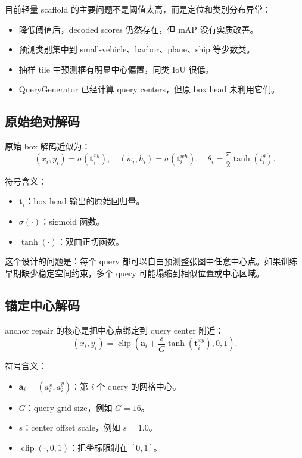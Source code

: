 \documentclass[11pt,a4paper]{ctexart}
\begin{document}
目前轻量 scaffold 的主要问题不是阈值太高，而是定位和类别分布异常：
\begin{itemize}
  \item 降低阈值后，decoded scores 仍然存在，但 mAP 没有实质改善。
  \item 预测类别集中到 small-vehicle、harbor、plane、ship 等少数类。
  \item 抽样 tile 中预测框有明显中心偏置，同类 IoU 很低。
  \item QueryGenerator 已经计算 query centers，但原 box head 未利用它们。
\end{itemize}

\subsection{原始绝对解码}

原始 box 解码近似为：
\[
(x_i,y_i)=\sigma(\bm t_i^{xy}),
\quad
(w_i,h_i)=\sigma(\bm t_i^{wh}),
\quad
\theta_i=\frac{\pi}{2}\tanh(t_i^\theta).
\]

符号含义：
\begin{itemize}
  \item $\bm t_i$：box head 输出的原始回归量。
  \item $\sigma(\cdot)$：sigmoid 函数。
  \item $\tanh(\cdot)$：双曲正切函数。
\end{itemize}

这个设计的问题是：每个 query 都可以自由预测整张图中任意中心点。如果训练早期缺少稳定空间约束，多个 query 可能塌缩到相似位置或中心区域。

\subsection{锚定中心解码}

anchor repair 的核心是把中心点绑定到 query center 附近：
\[
(x_i,y_i)=
\operatorname{clip}\left(
\bm a_i+\frac{s}{G}\tanh(\bm t_i^{xy}),0,1
\right).
\]

符号含义：
\begin{itemize}
  \item $\bm a_i=(a_i^x,a_i^y)$：第 $i$ 个 query 的网格中心。
  \item $G$：query grid size，例如 $G=16$。
  \item $s$：center offset scale，例如 $s=1.0$。
  \item $\operatorname{clip}(\cdot,0,1)$：把坐标限制在 $[0,1]$。
\end{itemize}
\end{document}
